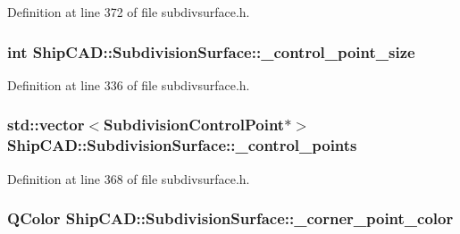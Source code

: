 Definition at line 372 of file subdivsurface.\-h.

\hypertarget{classShipCAD_1_1SubdivisionSurface_a7ad820b9d312c8ecde939b5345690d35}{
\subsubsection[{\-\_\-control\-\_\-point\-\_\-size}]{\setlength{\rightskip}{0pt plus 5cm}int Ship\-C\-A\-D\-::\-Subdivision\-Surface\-::\-\_\-control\-\_\-point\-\_\-size\hspace{0.3cm}{\ttfamily [protected]}}}\label{classShipCAD_1_1SubdivisionSurface_a7ad820b9d312c8ecde939b5345690d35}


Definition at line 336 of file subdivsurface.\-h.

\hypertarget{classShipCAD_1_1SubdivisionSurface_a906d5981dc482ede1bb3c7256e750945}{
\subsubsection[{\-\_\-control\-\_\-points}]{\setlength{\rightskip}{0pt plus 5cm}std\-::vector$<${\bf Subdivision\-Control\-Point}$\ast$$>$ Ship\-C\-A\-D\-::\-Subdivision\-Surface\-::\-\_\-control\-\_\-points\hspace{0.3cm}{\ttfamily [protected]}}}\label{classShipCAD_1_1SubdivisionSurface_a906d5981dc482ede1bb3c7256e750945}


Definition at line 368 of file subdivsurface.\-h.

\hypertarget{classShipCAD_1_1SubdivisionSurface_aba9fae36ed19b802707c748396c1fd63}{
\subsubsection[{\-\_\-corner\-\_\-point\-\_\-color}]{\setlength{\rightskip}{0pt plus 5cm}Q\-Color Ship\-C\-A\-D\-::\-Subdivision\-Surface\-::\-\_\-corner\-\_\-point\-\_\-color\hspace{0.3cm}{\ttfamily [protected]}}}\label{classShipCAD_1_1SubdivisionSurface_aba9fae36ed19b802707c748396c1fd63}


